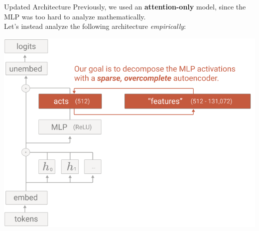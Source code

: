 \documentclass{beamer}
\begin{document}
\begin{frame}{Updated Architecture}
	Previously, we used an \textbf{attention-only} model, since the MLP was too hard to analyze mathematically. \pause \newline \\

	Let's instead analyze the following architecture \textit{empirically}:
	\begin{center}
		\includegraphics[width=.6\textwidth]{img/mono-arch.png}
	\end{center}
\end{frame}
	
\end{document}
